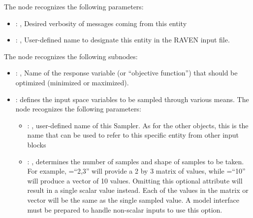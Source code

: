   The  node recognizes the following parameters:
    \begin{itemize}
      \item {}: ,
        Desired verbosity of messages coming from this entity
      \item {}: ,
        User-defined name to designate this entity in the RAVEN input file.
  \end{itemize}

  The  node recognizes the following subnodes:
  \begin{itemize}
    \item {}: ,
      Name of the response variable (or ``objective function'') that should be optimized
      (minimized or maximized).

    \item {}:
      defines the input space variables to be sampled through various means.
      The  node recognizes the following parameters:
        \begin{itemize}
          \item {}: ,
            user-defined name of this Sampler. \nb As for the other objects,               this is
            the name that can be used to refer to this specific entity from other input blocks
          \item {}: ,
            determines the number of samples and shape of samples               to be taken.  For
            example, =``2,3'' will provide a 2 by 3               matrix of values,
            while =``10'' will produce a vector of 10 values.               Omitting
            this optional attribute will result in a single scalar value instead.               Each
            of the values in the matrix or vector will be the same as the single sampled value.
            \nb A model interface must be prepared to handle non-scalar inputs to use this option.
      \end{itemize}


\end{itemize}
